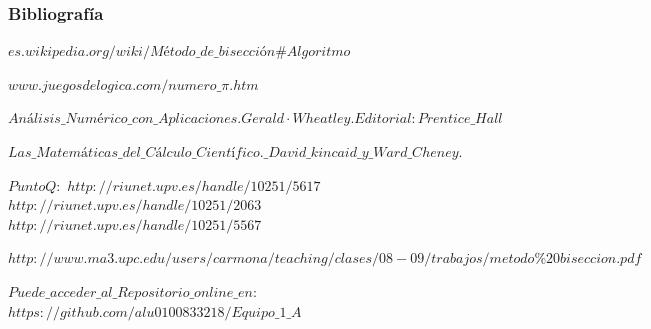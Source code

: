\documentclass{beamer}
\begin{document}
\begin{frame}
\frametitle{Bibliografía}
\begin{thebibliography}
  \beamertermplatebookbibitems
  {\small $es.wikipedia.org/wiki/Método\_de\_bisección\#Algoritmo$}
  
  \beamertermplatebookbibitems
  {\small $www.juegosdelogica.com/numero\_\pi.htm$}
  
  \beamertermplatebookbibitems
  {\small $Análisis\_Numérico\_con\_Aplicaciones. Gerald·Wheatley. Editorial: Prentice\_Hall$}
  
  \beamertermplatebookbibitems
  {\small $Las\_Matemáticas\_del\_Cálculo\_Científico.\_David \_kincaid\_y\_Ward\_Cheney.$}
  
  \beamertermplatebookbibitems
  {\small $PuntoQ:$}
  {\small$http://riunet.upv.es/handle/10251/5617$}
  {\small$http://riunet.upv.es/handle/10251/2063$}
  {\small$http://riunet.upv.es/handle/10251/5567$}
  
  \beamertermplatebookbibitems
  {\small $http://www.ma3.upc.edu/users/carmona/teaching/clases/08-09/trabajos/metodo\%20biseccion.pdf$}
  
  \beamertermplatebookbibitems
  {\small $Puede\_acceder\_al\_Repositorio\_online\_en:$}  
  {\small $https://github.com/alu0100833218/Equipo\_1\_A$}
  
  
\end{thebibliography}
\end{frame}
\end{document}
